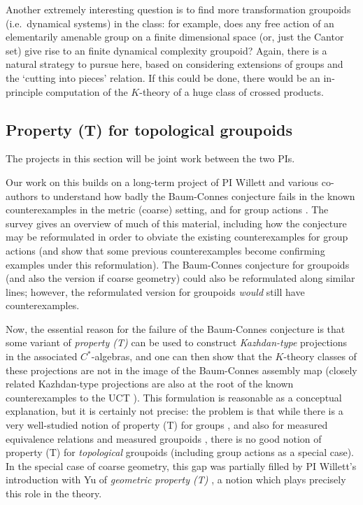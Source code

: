 \documentclass[11pt]{article}
\theoremstyle{plain}
\theoremstyle{definition}
\theoremstyle{remark}
\begin{document}
Another extremely interesting question is to find more transformation groupoids (i.e.\ dynamical systems) in the class: for example, does any free action of an elementarily amenable group on a finite dimensional space (or, just the Cantor set) give rise to an finite dynamical complexity groupoid?  Again, there is a natural strategy to pursue here, based on considering extensions of groups and the `cutting into pieces' relation.  If this could be done, there would be an in-principle computation of the $K$-theory of a huge class of crossed products.





\subsection{Property (T) for topological groupoids}\label{dydim}

The projects in this section will be joint work between the two PIs.

Our work on this builds on a long-term project of PI Willett and various co-authors to understand how badly the Baum-Connes conjecture fails \cite{Higson:2002la} in the known counterexamples in the metric (coarse) setting, and for group actions \cite{Willett:2010ud,Willett:2010zh,Baum:2013kx,Buss:2014aa}.  The survey \cite{Baum:2015le} gives an overview of much of this material, including how the conjecture may be reformulated in order to obviate the existing counterexamples for group actions (and show that some previous counterexamples become confirming examples under this reformulation).  The Baum-Connes conjecture for groupoids (and also the version if coarse geometry) could also be reformulated along similar lines; however, the reformulated version for groupoids \emph{would} still have counterexamples.

Now, the essential reason for the failure of the Baum-Connes conjecture is that some variant of \emph{property (T)} can be used to construct \emph{Kazhdan-type} projections in the associated $C^*$-algebras, and one can then show that the $K$-theory classes of these projections are not in the image of the Baum-Connes assembly map (closely related Kazhdan-type projections are also at the root of the known counterexamples to the UCT \cite{Skandalis:1988rr}).  This formulation is reasonable as a conceptual explanation, but it is certainly not precise: the problem is that while there is a very well-studied notion of property (T) for groups \cite{Bekka:2000kx}, and also for measured equivalence relations and measured groupoids \cite{Anantharaman-Delaroche:2005pb}, there is no good notion of property (T) for \emph{topological} groupoids (including group actions as a special case).  In the special case of coarse geometry, this gap was partially filled by PI Willett's introduction with Yu of \emph{geometric property (T)} \cite{Willett:2013cr}, a notion which plays precisely this role in the theory.
\end{document}
